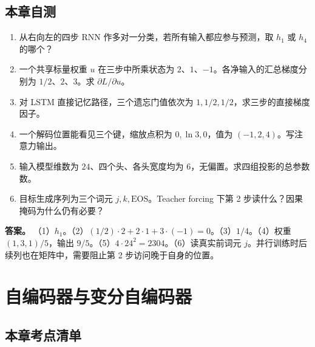 \documentclass[UTF8,a4paper,zihao=-4,fontset=fandol]{ctexrep}
\begin{document}
\section{本章自测}

\begin{enumerate}
\item 从右向左的四步 RNN 作多对一分类，若所有输入都应参与预测，取 $h_1$ 或 $h_4$ 的哪个？
\item 一个共享标量权重 $u$ 在三步中所乘状态为 $2$、$1$、$-1$。各净输入的汇总梯度分别为 $1/2$、$2$、$3$。求 $\partial L/\partial u$。
\item 对 LSTM 直接记忆路径，三个遗忘门值依次为 $1,1/2,1/2$，求三步的直接梯度因子。
\item 一个解码位置能看见三个键，缩放点积为 $0,\ln 3,0$，值为 $(-1,2,4)$。写注意力输出。
\item 输入模型维数为 $24$、四个头、各头宽度均为 $6$，无偏置。求四组投影的总参数数。
\item 目标生成序列为三个词元 $j,k,\mathrm{EOS}$。Teacher forcing 下第 2 步读什么？因果掩码为什么仍有必要？
\end{enumerate}
\textbf{答案。} （1）$h_1$。（2）$(1/2)\cdot2+2\cdot1+3\cdot(-1)=0$。（3）$1/4$。（4）权重 $(1,3,1)/5$，输出 $9/5$。（5）$4\cdot24^2=2304$。（6）读真实前词元 $j$。并行训练时后续列也在矩阵中，需要阻止第 2 步访问晚于自身的位置。

\chapter{自编码器与变分自编码器}

\section{本章考点清单}
\end{document}
